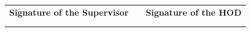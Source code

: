 \vspace{2.5cm}

\begin{table}[h!]
	\centering
	\begin{tabular}{l C{2.5cm} l}
		\textbf{Signature of the Supervisor} && \textbf{Signature of the HOD}\\
	\textbf{\guidename} && \textbf{\depthodname}\\
	\textbf{\guidedesignation} & &\textbf{\depthoddesignation}\\
	
	\end{tabular}
\end{table}
\vspace{1cm}

\noindent

\vspace{2cm}

\noindent


